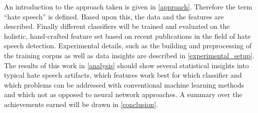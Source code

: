 An introduction to the approach taken is given in \autoref{approach}. Therefore the term \enquote{hate speech} is defined. Based upon this, the data and the features are described. Finally different classifiers will be trained and evaluated on the holistic, hand-crafted feature set based on recent pub\-li\-ca\-tions in the field of hate speech detection. 
Experimental details, such as the building and pre\-pro\-cess\-ing of the training corpus as well as data insights are described in \autoref{experimental_setup}.
The results of this work in \autoref{analysis} should show several statistical insights into typical hate speech artifacts, which features work best for which classifier and which problems can be addressed with conventional machine learning methods and which not as opposed to neural network approaches. 
A summary over the achievements earned will be drawn in \autoref{conclusion}.
